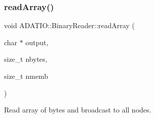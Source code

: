 \mbox{\label{classADATIO_1_1BinaryReader_a9c68e2d4ecd86773a48a3a38f0c90677}} 
\subsubsection{\texorpdfstring{readArray()}{readArray()}\hspace{0.1cm}{\footnotesize\ttfamily [1/2]}}
{\footnotesize\ttfamily void A\+D\+A\+T\+I\+O\+::\+Binary\+Reader\+::read\+Array (\begin{DoxyParamCaption}\item[{char $\ast$}]{output,  }\item[{size\+\_\+t}]{nbytes,  }\item[{size\+\_\+t}]{nmemb }\end{DoxyParamCaption})\hspace{0.3cm}{\ttfamily [virtual]}}



Read array of bytes and broadcast to all nodes. 

